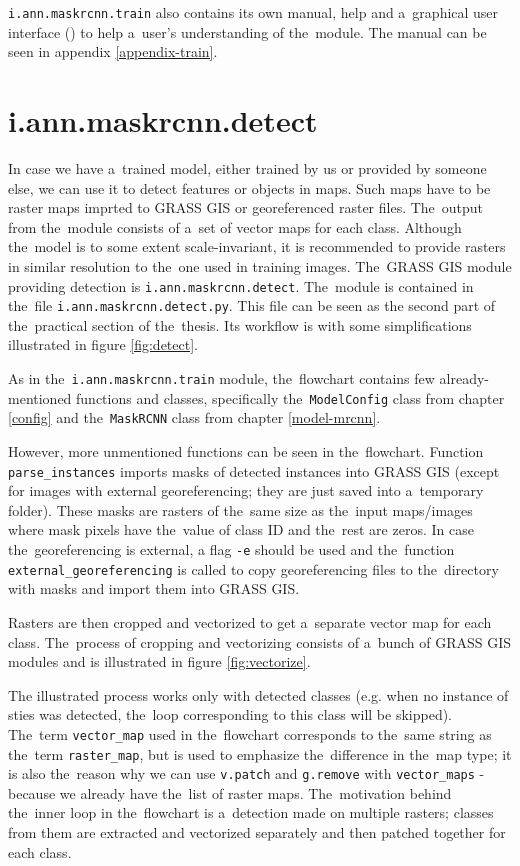 \verb|i.ann.maskrcnn.train| also contains its own manual, help and a~graphical 
user interface () to help a~user's understanding of the~module. The
manual can be seen in appendix \ref{appendix-train}.

\section{i.ann.maskrcnn.detect}
\label{detect-module}

In case we have a~trained model, either trained by us or provided by someone 
else, we can use it to detect features or objects in maps. Such maps have to be 
raster maps imprted to GRASS GIS or georeferenced raster files. The~output
from the~module consists of a~set of vector 
maps for each class. Although the~model is to some extent scale-invariant, it is 
recommended to provide rasters in similar resolution to the~one used in
training images. The~GRASS GIS module providing detection is
\verb|i.ann.maskrcnn.detect|. The~module is contained in the~file
\verb|i.ann.maskrcnn.detect.py|. This file can be seen as the second part of
the~practical section of the~thesis. Its workflow is with some simplifications
illustrated in figure \ref{fig:detect}.

As in the~\verb|i.ann.maskrcnn.train| module, the~flowchart contains few 
already-mentioned functions and classes, specifically the~\verb|ModelConfig| 
class from chapter \ref{config} and the~\verb|MaskRCNN| class from chapter 
\ref{model-mrcnn}.

However, more unmentioned functions can be seen in the~flowchart. Function
\verb|parse_instances| imports masks of detected instances into GRASS GIS
(except for images with external georeferencing; they are just saved into
a~temporary folder). These masks are rasters of the~same size as the~input
maps/images where mask pixels have the~value of class ID and the~rest are
zeros. In case the~georeferencing is external, a flag \verb|-e| should be
used and the~function \verb|external_georeferencing| is 
called to copy georeferencing files to the~directory with masks and import them
into GRASS GIS.

Rasters are then cropped and vectorized to get a~separate vector map for each
class. The~process of cropping and vectorizing consists of a~bunch of GRASS GIS
modules and is illustrated in figure \ref{fig:vectorize}.

The illustrated process works only with detected classes (e.g. when no instance 
of sties was detected, the~loop corresponding to this class will be skipped). 
The~term \verb|vector_map| used in the~flowchart corresponds to the~same string 
as the~term \verb|raster_map|, but is used to emphasize the~difference in
the~map type; it is also the~reason why we can use \verb|v.patch| and 
\verb|g.remove| with \verb|vector_maps| - because we already have the~list of 
raster maps. The~motivation behind the~inner loop in the~flowchart is
a~detection made on multiple rasters; classes from them are extracted and 
vectorized separately and then patched together for each class.

